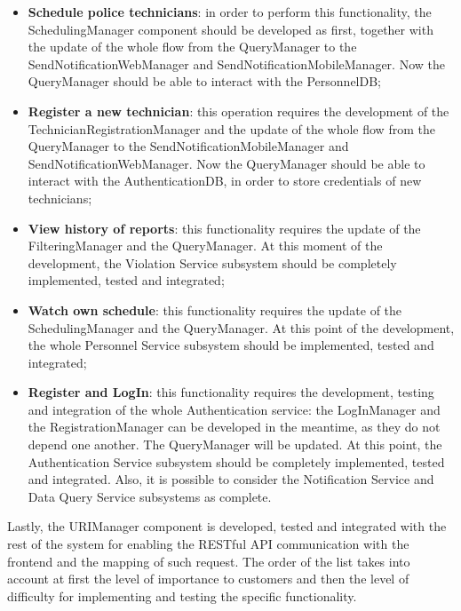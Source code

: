 \begin{itemize}
    \item \textbf{Schedule police technicians}: in order to perform this functionality, the SchedulingManager component should be developed as first, together with the update of the whole flow from the QueryManager to the SendNotificationWebManager and SendNotificationMobileManager. Now the QueryManager should be able to interact with the PersonnelDB;
    \item \textbf{Register a new technician}: this operation requires the development of the TechnicianRegistrationManager and the update of the whole flow from the QueryManager to the SendNotificationMobileManager and SendNotificationWebManager. Now the QueryManager should be able to interact with the AuthenticationDB, in order to store credentials of new technicians;
    \item \textbf{View history of reports}: this functionality requires the update of the FilteringManager and the QueryManager.  At this moment of the development, the Violation Service subsystem should be completely implemented, tested and integrated;
    \item \textbf{Watch own schedule}: this functionality requires the update of the \\ SchedulingManager and the QueryManager. At this point of the development, the whole Personnel Service subsystem should be implemented, tested and integrated;
    \item \textbf{Register and LogIn}: this functionality requires the development, testing and integration of the whole Authentication service: the LogInManager and the RegistrationManager can be developed in the meantime, as they do not depend one another. The QueryManager will be updated. At this point, the Authentication Service subsystem should be completely implemented, tested and integrated. Also, it is possible to consider the Notification Service and Data Query Service subsystems as complete.
\end{itemize}
Lastly, the URIManager component is developed, tested and integrated with the rest of the system for enabling the RESTful API communication with the frontend and the mapping of such request.
The order of the list takes into account at first the level of importance to customers and then the level of difficulty for implementing and testing the specific functionality.

